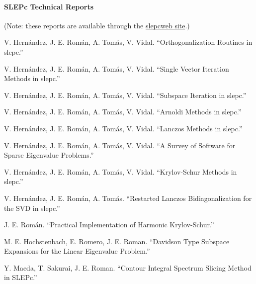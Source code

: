 \documentclass[titlepage,10pt,a4paper]{book}
\newcommand{\packnoi}[1]{{\sc #1}\xspace}
\newcommand{\slepc}{\texorpdfstring{\packnoi{slep\rm c}}{{SLEPc}}}
\begin{document}
{\bibfont
\paragraph{SLEPc Technical Reports}
\hypertarget{str}{}
(Note: these reports are available through the \href{http://slepc.upv.es}{\slepc web site}.)
\begin{list}{}{\setlength{\labelwidth}{3cm}\setlength{\leftmargin}{12.5mm}}
\item[\textrm{\sffamily[STR-1]}] V. Hern\'andez, J. E. Rom\'an, A. Tom\'as, V. Vidal. ``Orthogonalization Routines in \slepc.''
\item[\textrm{\sffamily[STR-2]}] V. Hern\'andez, J. E. Rom\'an, A. Tom\'as, V. Vidal. ``Single Vector Iteration Methods in \slepc.''
\item[\textrm{\sffamily[STR-3]}] V. Hern\'andez, J. E. Rom\'an, A. Tom\'as, V. Vidal. ``Subspace Iteration in \slepc.''
\item[\textrm{\sffamily[STR-4]}] V. Hern\'andez, J. E. Rom\'an, A. Tom\'as, V. Vidal. ``Arnoldi Methods in \slepc.''
\item[\textrm{\sffamily[STR-5]}] V. Hern\'andez, J. E. Rom\'an, A. Tom\'as, V. Vidal. ``Lanczos Methods in \slepc.''
\item[\textrm{\sffamily[STR-6]}] V. Hern\'andez, J. E. Rom\'an, A. Tom\'as, V. Vidal. ``A Survey of Software for Sparse Eigenvalue Problems.''
\item[\textrm{\sffamily[STR-7]}] V. Hern\'andez, J. E. Rom\'an, A. Tom\'as, V. Vidal. ``Krylov-Schur Methods in \slepc.''
\item[\textrm{\sffamily[STR-8]}] V. Hern\'andez, J. E. Rom\'an, A. Tom\'as. ``Restarted Lanczos Bidiagonalization for the SVD in \slepc.''
\item[\textrm{\sffamily[STR-9]}] J. E. Rom\'an. ``Practical Implementation of Harmonic Krylov-Schur.''
\item[\textrm{\sffamily[STR-10]}] M. E. Hochstenbach, E. Romero, J. E. Roman. ``Davidson Type Subspace Expansions for the Linear Eigenvalue Problem.''
\item[\textrm{\sffamily[STR-11]}] Y. Maeda, T. Sakurai, J. E. Roman. ``Contour Integral Spectrum Slicing Method in SLEPc.''
\end{list}
}

\cleardoublepage
\fancyhead{}

\cleardoublepage
\end{document}
